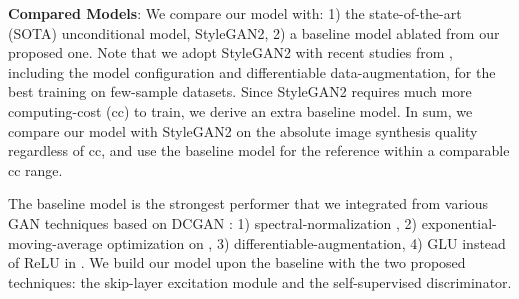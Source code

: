 \documentclass{article} \usepackage{iclr2021_conference,times}
\begin{document}
\textbf{Compared Models}: We compare our model with: 1) the state-of-the-art (SOTA) unconditional model, StyleGAN2, 2) a baseline model ablated from our proposed one. Note that we adopt StyleGAN2 with recent studies from \citep{karras2020training,zhao2020differentiable}, including the model configuration and differentiable data-augmentation, for the best training on few-sample datasets. Since StyleGAN2 requires much more computing-cost (cc) to train, we derive an extra baseline model. In sum, we compare our model with StyleGAN2 on the absolute image synthesis quality regardless of cc, and use the baseline model for the reference within a comparable cc range.

The baseline model is the strongest performer that we integrated from various GAN techniques based on DCGAN \citep{radford2015unsupervised}: 1) spectral-normalization \citep{miyato2018spectral}, 2) exponential-moving-average \citep{yazici2018unusual} optimization on , 3) differentiable-augmentation, 4) GLU \citep{dauphin2017language} instead of ReLU in . We build our model upon the baseline with the two proposed techniques: the skip-layer excitation module and the self-supervised discriminator. 

\begin{table}[h]
\caption{Computational cost comparison of the models.}
\label{table:compute-cost}
\begin{center}
\end{center}
\end{table}
\end{document}
